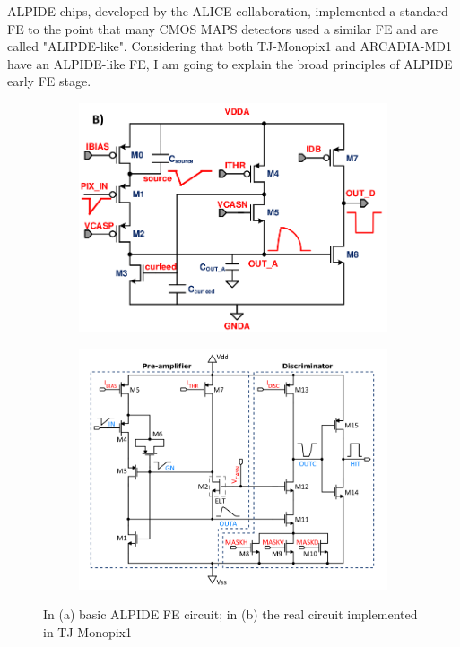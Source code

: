             ALPIDE chips, developed by the ALICE collaboration, implemented a standard FE to the point that many CMOS MAPS detectors used a similar FE and are called "ALIPDE-like". 
            Considering that both TJ-Monopix1 and ARCADIA-MD1 have an ALPIDE-like FE, I am going to explain the broad principles of ALPIDE early FE stage.
            \begin{figure}
                \centering
                \begin{subfigure}[b]{0.49\textwidth}
                    \centering
                    \includegraphics[width=\linewidth]{figures/Monopix1/ALPIDE_FE.png}
                    \caption{}
                    \label{fig:ALPIDE}
                \end{subfigure}
                \hfill
                \begin{subfigure}[b]{0.49\textwidth}
                    \centering
                    \includegraphics[width=\linewidth]{figures/Monopix1/Monopix1_FE_circuit.png}
                    \caption{}
                    \label{fig:Monopix_FE_circuit}
                \end{subfigure}
                \caption{In (a) basic ALPIDE FE circuit; in (b) the real circuit implemented in TJ-Monopix1}
                \label{fig:Monopix1_FE_circuit}
                \end{figure} 
